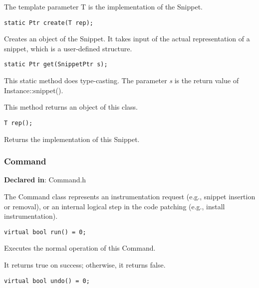 The template parameter T is the implementation of the Snippet.


\begin{verbatim}
static Ptr create(T rep);

\end{verbatim}



Creates an object of the Snippet. It takes input of the actual representation of
a snippet, which is a user-defined structure.


\begin{verbatim}
static Ptr get(SnippetPtr s);

\end{verbatim}



This static method does type-casting. The parameter \emph{s} is the return value of
Instance::snippet().

This method returns an object of this class.


\begin{verbatim}
T rep();

\end{verbatim}



Returns the implementation of this Snippet.

\subsubsection{Command}
\label{sec-3.2.3}

\textbf{Declared in}: Command.h

The Command class represents an instrumentation request (e.g., snippet insertion
or removal), or an internal logical step in the code patching (e.g., install
instrumentation).


\begin{verbatim}
virtual bool run() = 0;

\end{verbatim}



Executes the normal operation of this Command.

It returns true on success; otherwise, it returns false.


\begin{verbatim}
virtual bool undo() = 0;

\end{verbatim}



